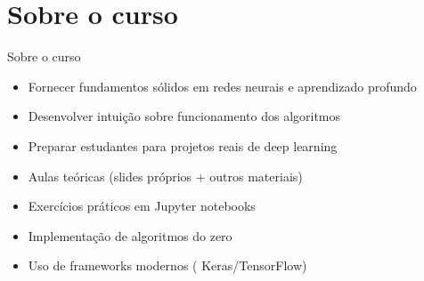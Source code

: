 \documentclass[xcolor=dvipsnames,t,aspectratio=169]{beamer} %
\newcommand{\highlight}[1]{{\color{nes_dark_orange} #1}}
\begin{document}
\section{Sobre o curso}
\begin{frame}[c]{Sobre o curso}
    \begin{display}[Objetivos]
        \begin{itemize}
            \item Fornecer \highlight{fundamentos sólidos} em redes neurais e aprendizado profundo
            \item Desenvolver \highlight{intuição} sobre funcionamento dos algoritmos
            \item Preparar estudantes para \highlight{projetos reais} de deep learning
        \end{itemize}
    \end{display}
    
    \begin{display}[Metodologia]
        \begin{itemize}
            \item Aulas teóricas (slides próprios + outros materiais)
            \item Exercícios práticos em \highlight{Jupyter notebooks}
            \item Implementação de algoritmos \highlight{do zero}
            \item Uso de frameworks modernos (\highlight{Keras/TensorFlow})
        \end{itemize}
    \end{display}
\end{frame}
\end{document}
